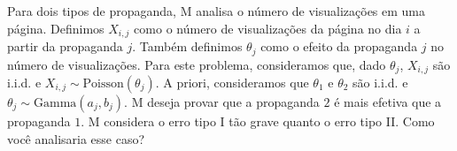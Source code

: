 
\begin{exercise}
 \label{ex:ad-effect}
 Para dois tipos de propaganda, 
 M analisa o número de visualizações em uma página.
 Definimos $X_{i,j}$ como o número de visualizações 
 da página no dia $i$ a partir da propaganda $j$.
 Também definimos $\theta_{j}$ como 
 o efeito da propaganda $j$ no número de visualizações.
 Para este problema, consideramos que, 
 dado $\theta_{j}$, $X_{i,j}$ são i.i.d.
 e $X_{i,j} \sim \text{Poisson}(\theta_{j})$.
 A priori, consideramos que 
 $\theta_{1}$ e $\theta_{2}$ são i.i.d. e
 $\theta_{j} \sim \text{Gamma}(a_{j},b_{j})$.
 M deseja provar que a propaganda $2$ é
 mais efetiva que a propaganda $1$.
 M considera o erro tipo I tão grave 
 quanto o erro tipo II.
 Como você analisaria esse caso?
\end{exercise}

